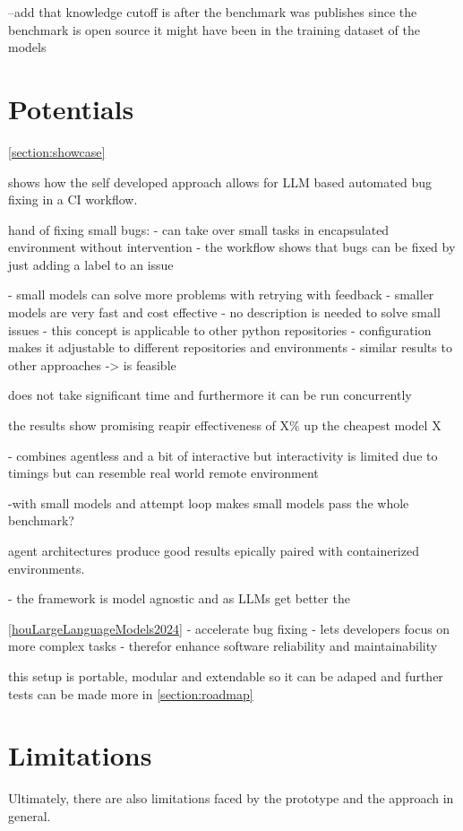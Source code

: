 --add that knowledge cutoff is after the benchmark was publishes since the benchmark is open source it might have been in the training dataset of the models

\section{Potentials}

\ref{section:showcase} 

shows how the self developed approach allows for LLM based automated bug fixing in a CI workflow. 

hand of fixing small bugs:
- can take over small tasks in encapsulated environment without intervention
- the workflow shows that bugs can be fixed by just adding a label to an issue

- small models can solve more problems with retrying with feedback
- smaller models are very fast and cost effective
- no description is needed to solve small issues
- this concept is applicable to other python repositories
- configuration makes it adjustable to different repositories and environments
- similar results to other approaches -> is feasible

does not take significant time and furthermore it can be run concurrently 

the results show promising reapir effectiveness of X\% up the cheapest model X

- combines agentless and a bit of interactive but interactivity is limited due to timings but can resemble real world remote environment

-with small models and attempt loop makes small models pass the whole benchmark?

agent architectures produce good results epically paired with containerized environments. \cite{puvvadiCodingAgentsComprehensive2025}

- the framework is model agnostic and as LLMs get better the


\ref{houLargeLanguageModels2024}
- accelerate bug fixing
- lets developers focus on more complex tasks
- therefor enhance software reliability and maintainability


this setup is portable, modular and extendable so it can be adaped and further tests can be made more in \ref{section:roadmap}

\section{Limitations}
Ultimately, there are also limitations faced by the prototype and the approach in general.

